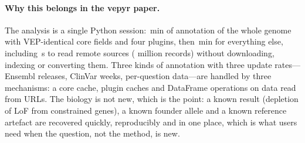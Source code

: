 \paragraph{Why this belongs in the vepyr paper.} The analysis is a single
Python session: \AnnotateMin\,min of annotation of the whole genome with
VEP-identical core fields and four plugins, then \AnalyzeMin\,min for
everything else, including \RemoteSec\,s to read \NRemoteSources{} remote
sources (\RemoteRows{} million records) without downloading, indexing or
converting them. Three kinds of annotation with three update rates---Ensembl
releases, ClinVar weeks, per-question data---are handled by three
mechanisms: a core cache, plugin caches and DataFrame operations on data read
from URLs. The biology is not new, which is the point: a known result
(depletion of LoF from constrained genes), a known founder allele and a
known reference artefact are recovered quickly, reproducibly and in one
place, which is what users need when the question, not the method, is new.
